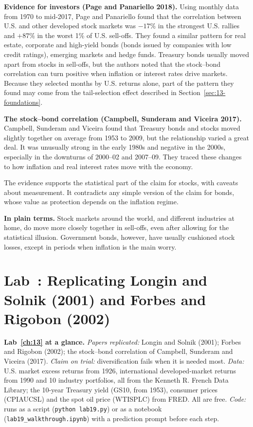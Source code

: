 \textbf{Evidence for investors (Page and Panariello 2018).} Using monthly data from 1970 to mid-2017, Page and Panariello found that the correlation between U.S. and other developed stock markets was $-17\%$ in the strongest U.S. rallies and $+87\%$ in the worst 1\% of U.S. sell-offs. They found a similar pattern for real estate, corporate and high-yield bonds (bonds issued by companies with low credit ratings), emerging markets and hedge funds. Treasury bonds usually moved apart from stocks in sell-offs, but the authors noted that the stock--bond correlation can turn positive when inflation or interest rates drive markets. Because they selected months by U.S. returns alone, part of the pattern they found may come from the tail-selection effect described in Section~\ref{sec:13-foundations}.

\textbf{The stock--bond correlation (Campbell, Sunderam and Viceira 2017).} Campbell, Sunderam and Viceira found that Treasury bonds and stocks moved slightly together on average from 1953 to 2009, but the relationship varied a great deal. It was unusually strong in the early 1980s and negative in the 2000s, especially in the downturns of 2000--02 and 2007--09. They traced these changes to how inflation and real interest rates move with the economy.

The evidence supports the statistical part of the claim for stocks, with caveats about measurement. It contradicts any simple version of the claim for bonds, whose value as protection depends on the inflation regime.

\noindent\textbf{In plain terms.} Stock markets around the world, and different industries at home, do move more closely together in sell-offs, even after allowing for the statistical illusion. Government bonds, however, have usually cushioned stock losses, except in periods when inflation is the main worry.

\section{Lab~\thechapter: Replicating Longin and Solnik (2001) and Forbes and Rigobon (2002)}
\label{sec:13-lab}

\begin{callout}
\textbf{Lab~\ref{ch:13} at a glance.} \emph{Papers replicated:} Longin and Solnik (2001); Forbes and Rigobon (2002); the stock--bond correlation of Campbell, Sunderam and Viceira (2017). \emph{Claim on trial:} diversification fails when it is needed most. \emph{Data:} U.S. market excess returns from 1926, international developed-market returns from 1990 and 10 industry portfolios, all from the Kenneth R. French Data Library; the 10-year Treasury yield (GS10, from 1953), consumer prices (CPIAUCSL) and the spot oil price (WTISPLC) from FRED. All are free. \emph{Code:} runs as a script (\texttt{python lab19.py}) or as a notebook (\texttt{lab19\_walkthrough.ipynb}) with a prediction prompt before each step.
\end{callout}

